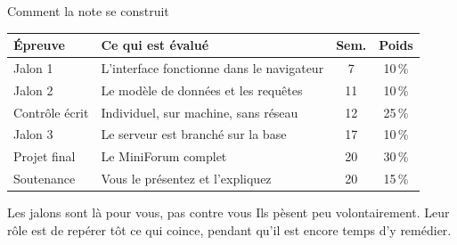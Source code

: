 \documentclass[aspectratio=169,11pt]{beamer}
\begin{document}
\begin{frame}{Comment la note se construit}
  \begin{center}
  \renewcommand{\arraystretch}{1.25}
  \begin{tabularx}{0.92\textwidth}{lXcc}
    \toprule
    \rowcolor{accentBlue}
    \color{white}\textbf{Épreuve} & \color{white}\textbf{Ce qui est évalué} &
    \color{white}\textbf{Sem.} & \color{white}\textbf{Poids} \\
    \midrule
    \rowcolor{cfptGrey}
    Jalon 1 & L'interface fonctionne dans le navigateur & 7 & 10\,\% \\
    Jalon 2 & Le modèle de données et les requêtes & 11 & 10\,\% \\
    \rowcolor{cfptGrey}
    Contrôle écrit & Individuel, sur machine, sans réseau & 12 & 25\,\% \\
    Jalon 3 & Le serveur est branché sur la base & 17 & 10\,\% \\
    \rowcolor{cfptGrey}
    Projet final & Le MiniForum complet & 20 & 30\,\% \\
    Soutenance & Vous le présentez et l'expliquez & 20 & 15\,\% \\
    \bottomrule
  \end{tabularx}
  \end{center}
  \vspace{0.05cm}
  \begin{block}{Les jalons sont là pour vous, pas contre vous}
    \small Ils pèsent peu volontairement. Leur rôle est de repérer tôt ce qui coince, pendant qu'il est encore temps d'y remédier.
  \end{block}
\end{frame}
\end{document}
